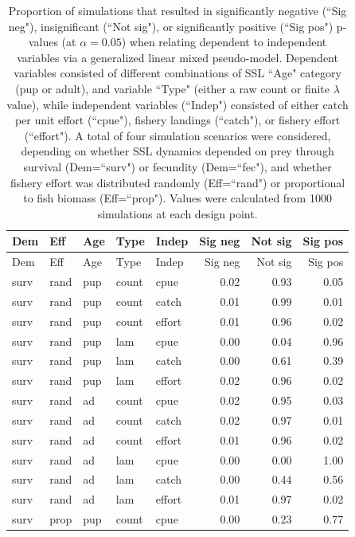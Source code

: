 \documentclass[11pt]{article}
\begin{document}
\begin{longtable}{lllllrrr}
\caption[Sim1]{\large Proportion of simulations that resulted in significantly negative (``Sig neg"), insignificant (``Not sig"), or significantly positive (``Sig pos") p-values (at $\alpha=0.05$) when relating dependent to independent variables via a generalized linear mixed pseudo-model.  Dependent variables consisted of different combinations of SSL ``Age" category (pup or adult), and variable ``Type" (either a raw count or finite $\lambda$ value), while independent variables (``Indep") consisted of either catch per unit effort (``cpue"), fishery landings (``catch"), or fishery effort (``effort").  A total of four simulation scenarios were considered, depending on whether SSL dynamics depended on prey through survival (Dem=``surv") or fecundity (Dem=``fec"), and whether fishery effort was distributed randomly (Eff=``rand") or proportional to fish biomass (Eff=``prop").  Values were calculated from 1000 simulations at each design point.}
\label{tab:sim1} \\
\hline \hline
Dem & Eff & Age & Type & Indep & Sig neg & Not sig & Sig pos \\
  \hline
\endfirsthead
\hline \hline
Dem & Eff & Age & Type & Indep & Sig neg & Not sig & Sig pos \\
  \hline
\endhead
\hline
\endfoot
\hline
\endlastfoot
surv & rand & pup & count & cpue & 0.02 & 0.93 & 0.05 \\
  surv & rand & pup & count & catch & 0.01 & 0.99 & 0.01 \\
  surv & rand & pup & count & effort & 0.01 & 0.96 & 0.02 \\
  surv & rand & pup & lam & cpue & 0.00 & 0.04 & 0.96 \\
  surv & rand & pup & lam & catch & 0.00 & 0.61 & 0.39 \\
  surv & rand & pup & lam & effort & 0.02 & 0.96 & 0.02 \\
  surv & rand & ad & count & cpue & 0.02 & 0.95 & 0.03 \\
  surv & rand & ad & count & catch & 0.02 & 0.97 & 0.01 \\
  surv & rand & ad & count & effort & 0.01 & 0.96 & 0.02 \\
  surv & rand & ad & lam & cpue & 0.00 & 0.00 & 1.00 \\
  surv & rand & ad & lam & catch & 0.00 & 0.44 & 0.56 \\
  surv & rand & ad & lam & effort & 0.01 & 0.97 & 0.02 \\
  surv & prop & pup & count & cpue & 0.00 & 0.23 & 0.77 \\

\end{longtable}
\end{document}
